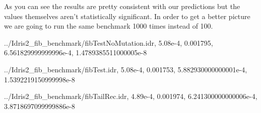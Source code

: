 \documentclass[
]{article}
\newenvironment{Shaded}{}{}
\newcommand{\DataTypeTok}[1]{\textcolor[rgb]{0.56,0.13,0.00}{#1}}
\newcommand{\FloatTok}[1]{\textcolor[rgb]{0.25,0.63,0.44}{#1}}
\newcommand{\NormalTok}[1]{#1}
\newcommand{\OperatorTok}[1]{\textcolor[rgb]{0.40,0.40,0.40}{#1}}
\begin{document}
As you can see the results are pretty consistent with our predictions
but the values themselves aren't statistically significant. In order to
get a better picture we are going to run the same benchmark 1000 times
instead of 100.

\begin{Shaded}
\begin{Highlighting}[]
\OperatorTok{../}\DataTypeTok{Idris2\_fib\_benchmark}\OperatorTok{/}\NormalTok{fibTestNoMutation}\OperatorTok{.}\NormalTok{idr,}
\FloatTok{5.08e{-}4}\NormalTok{,}
\FloatTok{0.001795}\NormalTok{,}
\FloatTok{6.561829999999996e{-}4}\NormalTok{,}
\FloatTok{1.4789385511000005e{-}8}

\OperatorTok{../}\DataTypeTok{Idris2\_fib\_benchmark}\OperatorTok{/}\NormalTok{fibTest}\OperatorTok{.}\NormalTok{idr,}
\FloatTok{5.08e{-}4}\NormalTok{,}
\FloatTok{0.001753}\NormalTok{,}
\FloatTok{5.882930000000001e{-}4}\NormalTok{,}
\FloatTok{1.5392219150999998e{-}8}

\OperatorTok{../}\DataTypeTok{Idris2\_fib\_benchmark}\OperatorTok{/}\NormalTok{fibTailRec}\OperatorTok{.}\NormalTok{idr,}
\FloatTok{4.89e{-}4}\NormalTok{,}
\FloatTok{0.001974}\NormalTok{,}
\FloatTok{6.241300000000006e{-}4}\NormalTok{,}
\FloatTok{3.8718697099999886e{-}8}


\end{Highlighting}
\end{Shaded}
\end{document}
